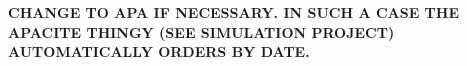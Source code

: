 \documentclass{article}
\begin{document}

\textbf{CHANGE TO APA IF NECESSARY. IN SUCH A CASE THE APACITE THINGY (SEE SIMULATION PROJECT) AUTOMATICALLY ORDERS BY DATE.}



\end{document}
